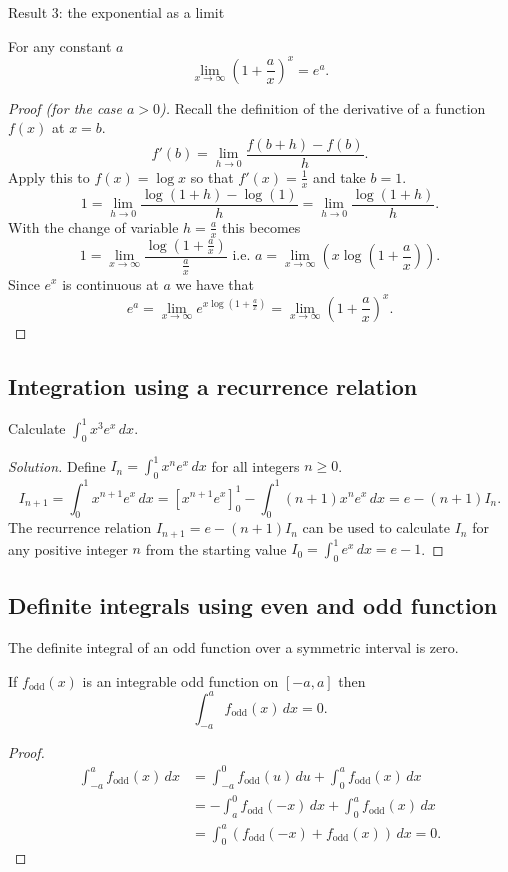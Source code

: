\documentclass[10pt, a4paper]{article}
\begin{document}
Result $3$: the exponential as a limit

For any constant $a$
\[
\lim_{x \rightarrow \infty}\left(1 + \frac{a}{x}\right) ^ x = e ^ a.
\]
\begin{proof}[Proof (for the case $a > 0$)]
    Recall the definition of the derivative of a function $f(x)$ at $x = b$.
    \[
    f'(b) = \lim_{h \rightarrow 0}\frac{f(b + h) - f(b)}{h}.
    \]
    Apply this to $f(x) = \log x$ so that $f'(x) = \frac{1}{x}$ and take $b = 1$.
    \[
    1 = \lim_{h \rightarrow 0}\frac{\log(1 + h) - \log(1)}{h} = \lim_{h \rightarrow 0}\frac{\log(1 + h)}{h}.
    \]
    With the change of variable $h = \frac{a}{x}$ this becomes
    \[
    1 = \lim_{x \rightarrow \infty}\frac{\log\left(1 + \frac{a}{x}\right)}{\frac{a}{x}}\text{ i.e. } a = \lim_{x \rightarrow \infty}\left(x\log\left(1 + \frac{a}{x}\right)\right).
    \]
    Since $e ^ x$ is continuous at $a$ we have that
    \[
    e ^ a = \lim_{x \rightarrow \infty}e ^ {x\log\left(1 + \frac{a}{x}\right)} = \lim_{x \rightarrow \infty}\left(1 + \frac{a}{x}\right) ^ x.
    \]
\end{proof}

\subsection{Integration using a recurrence relation}
\begin{example}
    Calculate $\int_0^1 x ^ 3 e ^ x\,dx$.
    \begin{proof}[Solution]\renewcommand{\qedsymbol}{}
        Define $I_n = \int_0^1x ^ n e ^ x\,dx$ for all integers $n \geq 0$.
        \[
        I_{n + 1} = \int_0^1 x ^ {n + 1}e ^ x\,dx = \left[x ^ {n + 1}e ^ x\right]_0^1 - \int_0^1(n + 1)x ^ n e ^ x\,dx = e - (n + 1)I_n.
        \]
        The recurrence relation $I_{n + 1} = e - (n + 1)I_n$ can be used to calculate $I_n$ for any positive integer $n$ from the starting value $I_0 = \int_0^1e ^ x\,dx = e - 1$.
    \end{proof}
\end{example}

\subsection{Definite integrals using even and odd function}
The definite integral of an odd function over a symmetric interval is zero.

If $f_{\text{odd}}(x)$ is an integrable odd function on $[-a, a]$ then
\[
\int_{-a}^{a}f_{\text{odd}}(x)\,dx = 0.
\]
\begin{proof}
    \begin{align*}
        \int_{-a}^{a}f_{\text{odd}}(x)\,dx &= \int_{-a}^{0}f_{\text{odd}}(u)\,du + \int_0^af_{\text{odd}}(x)\,dx \\
        &= -\int_{a}^{0}f_{\text{odd}}(-x)\,dx + \int_0^af_{\text{odd}}(x)\,dx \\
        &= \int_0^a(f_{\text{odd}}(-x) + f_{\text{odd}}(x))\,dx = 0.
    \end{align*}
\end{proof}
\end{document}
